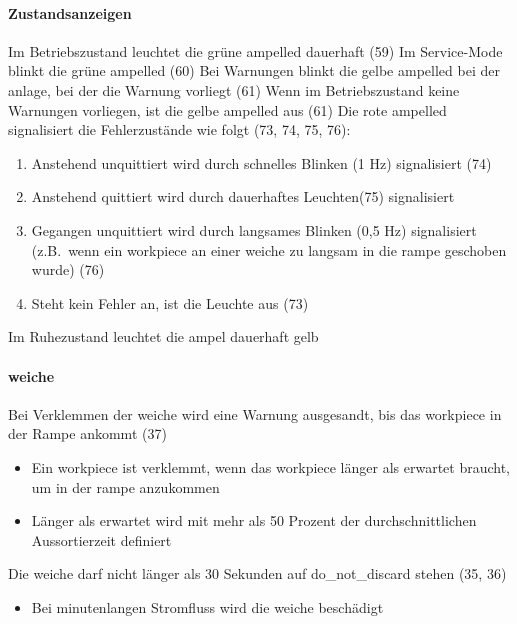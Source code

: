 \paragraph{Zustandsanzeigen}
\begin{itemize}
     Im Betriebszustand leuchtet die grüne \gls{ampelled} dauerhaft (59)
     Im Service-Mode blinkt die grüne \gls{ampelled}  (60)
     Bei Warnungen blinkt die gelbe \gls{ampelled} bei der \gls{anlage}, bei der die Warnung vorliegt (61)
     Wenn im Betriebszustand keine Warnungen vorliegen, ist die gelbe \gls{ampelled} aus (61)
     Die rote \gls{ampelled} signalisiert die Fehlerzustände wie folgt (73, 74, 75, 76):
    \begin{enumerate}
        \item\label{req-37-unq} Anstehend unquittiert wird durch schnelles Blinken (1 Hz) signalisiert (74)
        \item\label{req-37-quit} Anstehend quittiert wird durch dauerhaftes Leuchten(75) signalisiert
        \item\label{req-37-geg} Gegangen unquittiert wird durch langsames Blinken (0,5 Hz) signalisiert (z.B.\ wenn ein
        \gls{workpiece} an einer \gls{weiche} zu langsam in die \gls{rampe} geschoben wurde) (76)
        \item\label{req-37-ok} Steht kein Fehler an, ist die Leuchte aus (73)
    \end{enumerate}
     Im Ruhezustand leuchtet die \gls{ampel} dauerhaft gelb
\end{itemize}

\paragraph{\gls{weiche}}
\begin{itemize}
     Bei Verklemmen der \gls{weiche} wird eine Warnung ausgesandt, bis das \gls{workpiece} in der Rampe ankommt (37)
    \begin{itemize}
        \item Ein \gls{workpiece} ist verklemmt, wenn das \gls{workpiece} länger als erwartet braucht, um in der \gls{rampe} anzukommen
        \item Länger als erwartet wird mit mehr als 50 Prozent der durchschnittlichen Aussortierzeit definiert
    \end{itemize}
     Die \gls{weiche} darf nicht länger als 30 Sekunden auf \gls{do_not_discard} stehen (35, 36)
    \begin{itemize}
        \item Bei minutenlangen Stromfluss wird die \gls{weiche} beschädigt
    \end{itemize}
\end{itemize}

